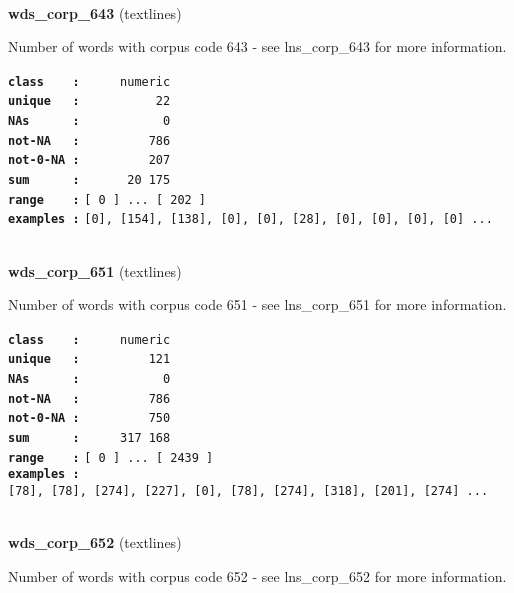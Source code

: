 \documentclass[]{article}
\begin{document}
~

\textbf{wds\_corp\_643} (textlines)

Number of words with corpus code 643 - see lns\_corp\_643 for more
information.

\textbf{\texttt{class\ \ \ \ :}} \texttt{~~~~~numeric}\\
\textbf{\texttt{unique\ \ \ :}} \texttt{~~~~~~~~~~22}\\
\textbf{\texttt{NAs\ \ \ \ \ \ :}} \texttt{~~~~~~~~~~~0}\\
\textbf{\texttt{not-NA\ \ \ :}} \texttt{~~~~~~~~~786}\\
\textbf{\texttt{not-0-NA\ :}} \texttt{~~~~~~~~~207}\\
\textbf{\texttt{sum\ \ \ \ \ \ :}} \texttt{~~~~~~20~175}\\
\textbf{\texttt{range\ \ \ \ :}}
\texttt{{[}\ 0\ {]}\ ...\ {[}\ 202\ {]}}\\
\textbf{\texttt{examples\ :}}
\texttt{{[}0{]},\ {[}154{]},\ {[}138{]},\ {[}0{]},\ {[}0{]},\ {[}28{]},\ {[}0{]},\ {[}0{]},\ {[}0{]},\ {[}0{]}\ ...}\\

~

\textbf{wds\_corp\_651} (textlines)

Number of words with corpus code 651 - see lns\_corp\_651 for more
information.

\textbf{\texttt{class\ \ \ \ :}} \texttt{~~~~~numeric}\\
\textbf{\texttt{unique\ \ \ :}} \texttt{~~~~~~~~~121}\\
\textbf{\texttt{NAs\ \ \ \ \ \ :}} \texttt{~~~~~~~~~~~0}\\
\textbf{\texttt{not-NA\ \ \ :}} \texttt{~~~~~~~~~786}\\
\textbf{\texttt{not-0-NA\ :}} \texttt{~~~~~~~~~750}\\
\textbf{\texttt{sum\ \ \ \ \ \ :}} \texttt{~~~~~317~168}\\
\textbf{\texttt{range\ \ \ \ :}}
\texttt{{[}\ 0\ {]}\ ...\ {[}\ 2439\ {]}}\\
\textbf{\texttt{examples\ :}}
\texttt{{[}78{]},\ {[}78{]},\ {[}274{]},\ {[}227{]},\ {[}0{]},\ {[}78{]},\ {[}274{]},\ {[}318{]},\ {[}201{]},\ {[}274{]}\ ...}\\

~

\textbf{wds\_corp\_652} (textlines)

Number of words with corpus code 652 - see lns\_corp\_652 for more
information.
\end{document}
